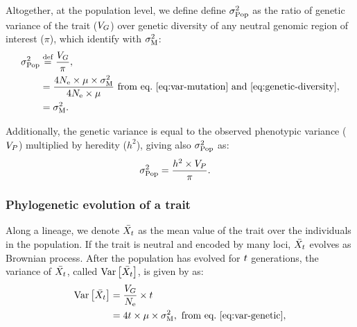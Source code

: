 \documentclass{article}
\begin{document}
Altogether, at the population level, we define define $\sigma^2_{\text{Pop}}$ as the ratio of genetic variance of the trait ($V_{G}$) over genetic diversity of any neutral genomic region of interest ($\pi$), which identify with $\sigma^2_{\text{M}}$:
\begin{align}
    \sigma^2_{\text{Pop}} & \stackrel{\text{def}}{=} \frac{V_{G} }{\pi}, \\
    & = \frac{4 N_{\text{e}} \times \mu \times \sigma^2_{\text{M}}}{4 N_{\text{e}} \times \mu} \text{ from eq.~\ref{eq:var-mutation} and \ref{eq:genetic-diversity}}, \\
    & = \sigma^2_{\text{M}}. \label{eq:rate-pop}
\end{align}

Additionally, the genetic variance is equal to the observed phenotypic variance ($V_{P}$) multiplied by heredity ($h^2$), giving also $\sigma^2_{\text{Pop}}$ as:
\begin{align}
    \sigma^2_{\text{Pop}} & = \frac{h^2 \times V_{P} }{\pi }. \label{eq:rate-pheno-pop}
\end{align}

\subsubsection{Phylogenetic evolution of a trait}

Along a lineage, we denote $\bar{X_{t}}$ as the mean value of the trait over the individuals in the population.
If the trait is neutral and encoded by many loci, $\bar{X_{t}}$ evolves as Brownian process\cite{hansen_translating_1996}.
After the population has evolved for $t$ generations, the variance of $\bar{X_{t}}$, called $\operatorname{\text{Var}} \left[\bar{X_{t}}\right]$, is given by \textcite{hansen_translating_1996} as:
\begin{align}
    \operatorname{\text{Var}} \left[\bar{X_{t}}\right] & = \frac{V_{G}}{N_{\text{e}}} \times t \\
    & = 4 t \times \mu \times \sigma^2_{\text{M}} \label{eq:covar},\text{ from eq.~\ref{eq:var-genetic}},
\end{align}
\end{document}
